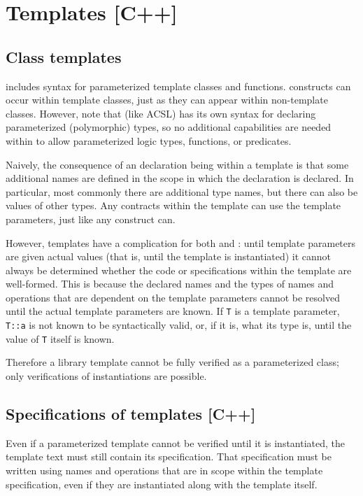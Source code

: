 \section{Templates [C++]}
\label{sec:tempaltes}
\subsection{Class templates}

\lang{} includes syntax for parameterized template classes and functions.  \NAME{} constructs can occur within template classes, just as they can appear within non-template classes. However, note that \NAME{} (like ACSL) has its own syntax for declaring parameterized (polymorphic) types, so no additional 
capabilities are needed within \NAME{} to allow
parameterized logic types, functions, or predicates.

Naively, the consequence of an \NAME{} declaration being within a template is that some additional names are defined in the scope in which the \NAME{} declaration is declared. In particular, most commonly there are additional type names, but there can also be values of other types. Any \NAME{} contracts within the template can use the template parameters, just like any \lang{} construct can. 

However, templates have a complication for both \lang{} and \NAME{}: until template parameters are given actual values (that is, until the template is instantiated) it cannot always be determined whether the code or specifications within the template are well-formed. This is because the declared names and the types of names and operations that are dependent on the template parameters cannot be resolved until the actual template parameters are known.  If \lstinline|T| is a template parameter, \lstinline|T::a| is not known to be syntactically valid, or, if it is, what its type is, until the value of \lstinline|T| itself is known.

Therefore a library template cannot be fully verified as a parameterized class; only verifications of instantiations are possible.

\subsection{Specifications of templates [C++]}

Even if a parameterized template cannot be verified until it is instantiated, the template text must still contain its specification. That specification must be written using names and operations that are in scope within the template specification, even if they are instantiated along with the template itself.

